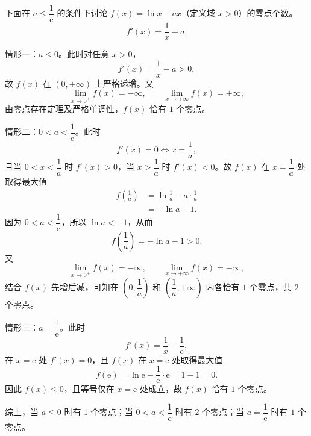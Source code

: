\begin{answer}
下面在 $a\leqslant\dfrac1{\mathrm e}$ 的条件下讨论 $f(x)=\ln x-ax$（定义域 $x>0$）的零点个数。
\nopagebreak[4]
\[f'(x)=\frac1x-a.\]

情形一：$a\leqslant0$。此时对任意 $x>0$，
\nopagebreak[4]
\[f'(x)=\frac1x-a>0,\]
故 $f(x)$ 在 $(0,+\infty)$ 上严格递增。又
\nopagebreak[4]
\[\lim_{x\to0^+}f(x)=-\infty,\qquad
\lim_{x\to+\infty}f(x)=+\infty,\]
由零点存在定理及严格单调性，$f(x)$ 恰有 $1$ 个零点。

情形二：$0<a<\dfrac1{\mathrm e}$。此时
\nopagebreak[4]
\[f'(x)=0\Longleftrightarrow x=\frac1a,\]
且当 $0<x<\dfrac1a$ 时 $f'(x)>0$，当 $x>\dfrac1a$ 时 $f'(x)<0$。故 $f(x)$ 在 $x=\dfrac1a$ 处取得最大值
\nopagebreak[4]
\[\begin{aligned}
f\left(\frac1a\right)
&=\ln\frac1a-a\cdot\frac1a\\
&=-\ln a-1.
\end{aligned}\]
因为 $0<a<\dfrac1{\mathrm e}$，所以 $\ln a<-1$，从而
\nopagebreak[4]
\[f\left(\frac1a\right)=-\ln a-1>0.\]
又
\nopagebreak[4]
\[\lim_{x\to0^+}f(x)=-\infty,\qquad
\lim_{x\to+\infty}f(x)=-\infty,\]
结合 $f(x)$ 先增后减，可知在 $\left(0,\dfrac1a\right)$ 和 $\left(\dfrac1a,+\infty\right)$ 内各恰有 $1$ 个零点，共 $2$ 个零点。

情形三：$a=\dfrac1{\mathrm e}$。此时
\nopagebreak[4]
\[f'(x)=\frac1x-\frac1{\mathrm e},\]
在 $x=\mathrm e$ 处 $f'(x)=0$，且 $f(x)$ 在 $x=\mathrm e$ 处取得最大值
\nopagebreak[4]
\[f(\mathrm e)=\ln\mathrm e-\frac1{\mathrm e}\cdot\mathrm e=1-1=0.\]
因此 $f(x)\leqslant0$，且等号仅在 $x=\mathrm e$ 处成立，故 $f(x)$ 恰有 $1$ 个零点。

综上，当 $a\leqslant0$ 时有 $1$ 个零点；当 $0<a<\dfrac1{\mathrm e}$ 时有 $2$ 个零点；当 $a=\dfrac1{\mathrm e}$ 时有 $1$ 个零点。



\end{answer}
